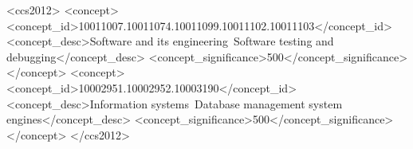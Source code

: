 \documentclass[sigconf,review,anonymous]{acmart}
\begin{document}
\begin{abstract}


\end{abstract}

\begin{CCSXML}
<ccs2012>
   <concept>
       <concept_id>10011007.10011074.10011099.10011102.10011103</concept_id>
       <concept_desc>Software and its engineering~Software testing and debugging</concept_desc>
       <concept_significance>500</concept_significance>
   </concept>
   <concept>
       <concept_id>10002951.10002952.10003190</concept_id>
       <concept_desc>Information systems~Database management system engines</concept_desc>
       <concept_significance>500</concept_significance>
   </concept>
 </ccs2012>
\end{CCSXML}



\end{document}
